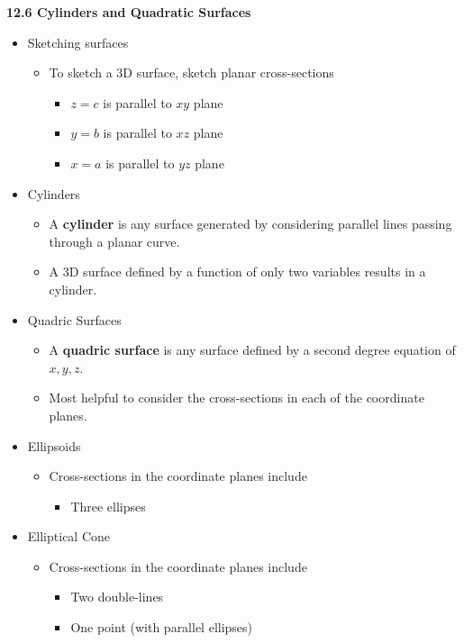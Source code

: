 \centerline{\bf 12.6 Cylinders and Quadratic Surfaces }%

\begin{itemize}
\item Sketching surfaces

  \begin{itemize}
  \item To sketch a 3D surface, sketch planar cross-sections
    \begin{itemize}
    \item $z=c$ is parallel to $xy$ plane
    \item $y=b$ is parallel to $xz$ plane
    \item $x=a$ is parallel to $yz$ plane
    \end{itemize}
  \end{itemize}

\item Cylinders

  \begin{itemize}
  \item A \textbf{cylinder} is any surface generated by considering parallel lines passing through a planar curve.
  \item A 3D surface defined by a function of only two variables results in a cylinder.
  \end{itemize}

\item Quadric Surfaces

  \begin{itemize}
  \item A \textbf{quadric surface} is any surface defined by a second degree equation of $x,y,z$.
  \item Most helpful to consider the cross-sections in each of the coordinate planes.
  \end{itemize}

\item Ellipsoids
  \begin{itemize}
  \item Cross-sections in the coordinate planes include
    \begin{itemize}
    \item Three ellipses
    \end{itemize}
  \end{itemize}

\item Elliptical Cone
  \begin{itemize}
  \item Cross-sections in the coordinate planes include
    \begin{itemize}
    \item Two double-lines
    \item One point (with parallel ellipses)
    \end{itemize}
  \end{itemize}


\end{itemize}
